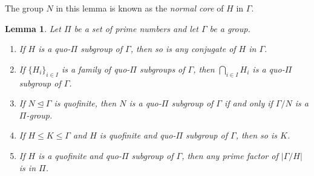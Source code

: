 \documentclass[11pt]{amsart}
\newtheorem{lemma}[theorem]{Lemma}
\theoremstyle{definition}
\theoremstyle{definition}
\numberwithin{equation}{section}
\begin{document}
The group $N$ in this lemma is known as the {\em normal core} of $H$ in $\Gamma$.

\begin{lemma}\label{lem:quoPi} Let $\Pi$ be a set of prime numbers and let $\Gamma$ be a group. 
\begin{enumerate}
\item[(1)] If $H$ is a quo-$\Pi$ subgroup of $\Gamma$, then so is any conjugate of $H$ in $\Gamma$.
\item[(2)] If $\{H_i\}_{i\in I}$ is a family of quo-$\Pi$ subgroups of $\Gamma$, then $\bigcap_{i\in I}H_i$ is a quo-$\Pi$ subgroup of $\Gamma$.
\item[(3)] If $N\unlhd \Gamma$ is quofinite, then $N$ is a quo-$\Pi$ subgroup of $\Gamma$ if and only if $\Gamma/N$ is a $\Pi$-group.
\item[(4)] If $H\leq K\leq \Gamma$ and $H$ is quofinite and quo-$\Pi$ subgroup of $\Gamma$, then so is $K$.
\item[(5)] If $H$ is a quofinite and quo-$\Pi$ subgroup of $\Gamma$, then any prime factor of $|\Gamma/H|$ is in $\Pi$.
\end{enumerate}
\end{lemma}
\end{document}

